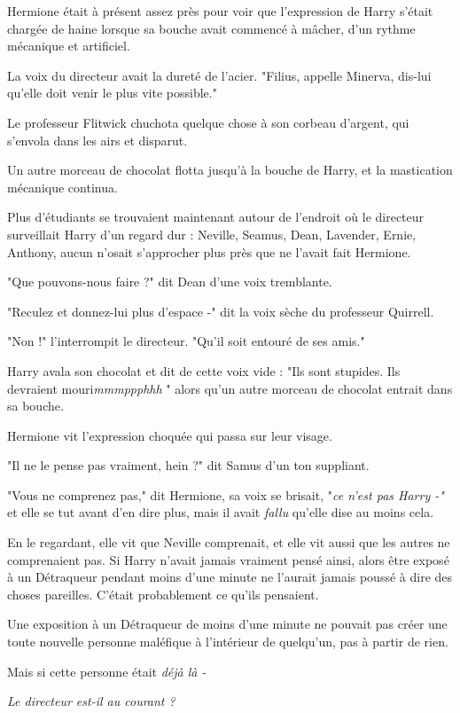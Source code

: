 Hermione était à présent assez près pour voir que l'expression de Harry s'était chargée de haine lorsque sa bouche avait commencé à mâcher, d'un rythme mécanique et artificiel.

La voix du directeur avait la dureté de l'acier. "Filius, appelle Minerva, dis-lui qu'elle doit venir le plus vite possible."

Le professeur Flitwick chuchota quelque chose à son corbeau d'argent, qui s'envola dans les airs et disparut.

Un autre morceau de chocolat flotta jusqu'à la bouche de Harry, et la mastication mécanique continua.

Plus d'étudiants se trouvaient maintenant autour de l'endroit où le directeur surveillait Harry d'un regard dur : Neville, Seamus, Dean, Lavender, Ernie, Anthony, aucun n'osait s'approcher plus près que ne l'avait fait Hermione.

"Que pouvons-nous faire ?" dit Dean d'une voix tremblante.

"Reculez et donnez-lui plus d'espace -" dit la voix sèche du professeur Quirrell.

"Non !" l'interrompit le directeur. "Qu'il soit entouré de ses amis."

Harry avala son chocolat et dit de cette voix vide : "Ils sont stupides. Ils devraient mouri\emph{mmmppphhh} " alors qu'un autre morceau de chocolat entrait dans sa bouche.

Hermione vit l'expression choquée qui passa sur leur visage.

"Il ne le pense pas vraiment, hein ?" dit Samus d'un ton suppliant.

"Vous ne comprenez pas," dit Hermione, sa voix se brisait, "\emph{ce n'est pas Harry -"}  et elle se tut avant d'en dire plus, mais il avait \emph{fallu } qu'elle dise au moins cela.

En le regardant, elle vit que Neville comprenait, et elle vit aussi que les autres ne comprenaient pas. Si Harry n'avait jamais vraiment pensé ainsi, alors être exposé à un Détraqueur pendant moins d'une minute ne l'aurait jamais poussé à dire des choses pareilles. C'était probablement ce qu'ils pensaient.

Une exposition à un Détraqueur de moins d'une minute ne pouvait pas créer une toute nouvelle personne maléfique à l'intérieur de quelqu'un, pas à partir de rien.

Mais si cette personne était \emph{déjà là -} 

\emph{Le directeur est-il au courant ?} 

